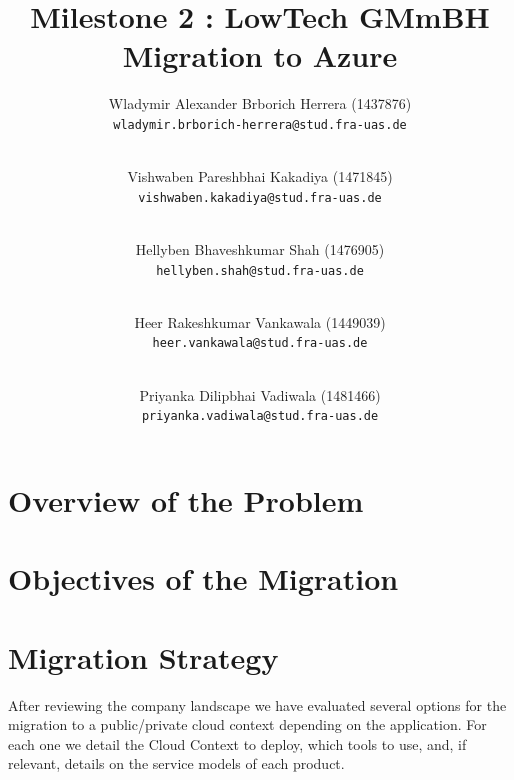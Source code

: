 \documentclass{llncs}
\newcommand{\what}{Milestone 2 : LowTech GMmBH Migration to Azure}
\begin{document}
%
%
%
\mainmatter              %
%
\title{\what}
%
\author{
    Wladymir Alexander Brborich Herrera (1437876)\\
    \texttt{wladymir.brborich-herrera@stud.fra-uas.de}
    \and\\
    Vishwaben Pareshbhai Kakadiya (1471845)\\
    \texttt{vishwaben.kakadiya@stud.fra-uas.de}
    \and\\
    Hellyben Bhaveshkumar Shah (1476905)\\
    \texttt{hellyben.shah@stud.fra-uas.de}
    \and\\
    Heer Rakeshkumar Vankawala (1449039)
    \\
    \texttt{heer.vankawala@stud.fra-uas.de}
    \and\\
    Priyanka Dilipbhai Vadiwala (1481466)\\
    \texttt{priyanka.vadiwala@stud.fra-uas.de}
}
%

\maketitle              %

\begin{abstract}

\end{abstract}

\section{Overview of the Problem}


\section{Objectives of the Migration}

\section{Migration Strategy}

After reviewing the company landscape we have evaluated several options for the migration to a public/private cloud context depending on the application.
For each one we detail the Cloud Context to deploy, which tools to use, and, if relevant, details on the service models of each product.
\end{document}
